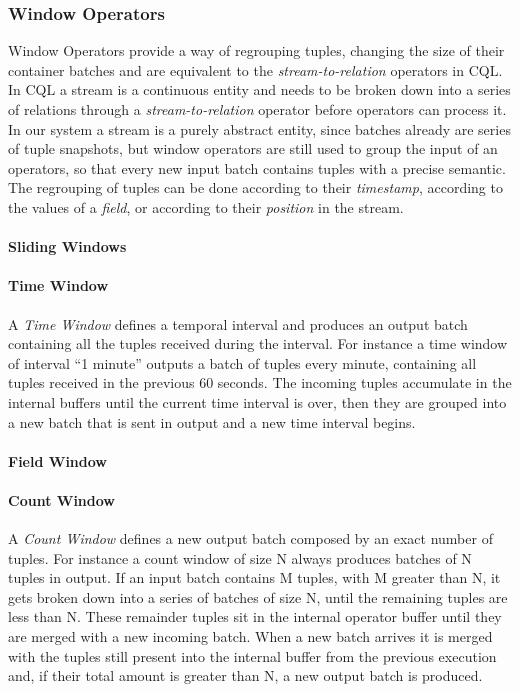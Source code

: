 
\subsubsection*{Window Operators}
\label{sec:window-op}
Window Operators provide a way of regrouping tuples, changing the size of their container batches and are
equivalent to the \emph{stream-to-relation} operators in CQL. 
In CQL a stream is a continuous entity and needs to be broken down into a series of relations through a
\emph{stream-to-relation} operator before operators can process it. In our system a stream is a purely 
abstract entity, since batches already are series of tuple snapshots, but window operators are still used
to group the input of an operators, so that every new input batch contains tuples with a precise
semantic. The regrouping of tuples can be done according to their \emph{timestamp}, according to the
values of a \emph{field}, or according to their \emph{position} in the stream.

\paragraph{Sliding Windows}


\paragraph{Time Window}
A \emph{Time Window} defines a temporal interval and produces an output batch containing all the tuples
received during the interval. For instance a time window of interval ``1 minute'' outputs a batch of
tuples every minute, containing all tuples received in the previous 60 seconds. The incoming tuples
accumulate in the internal buffers until the current time interval is over, then they are grouped into a
new batch that is sent in output and a new time interval begins. 

\paragraph{Field Window}

\paragraph{Count Window}
A \emph{Count Window} defines a new output batch composed by an exact number of tuples. For instance a
count window of size N always produces batches of N tuples in output. If an input batch contains M
tuples, with M greater than N, it gets broken down into a series of batches of size N, until the
remaining tuples are less than N. These remainder tuples sit in the internal operator buffer until they
are merged with a new incoming batch. When a new batch arrives it is merged with the tuples still present
into the internal buffer from the previous execution and, if their total amount is greater than N, a new
output batch is produced.   

